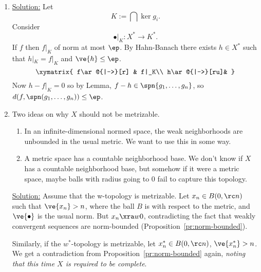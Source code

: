 \begin{enumerate}




\item
\ul{Solution:} Let
\[
K:=\bigcap \ker g_i.
\]
Consider
\[\bullet|_{K}:X^*\to K^*.\] 
If $f$ then $f|_{K}$ of norm at most $\ep$. By Hahn-Banach there exists $h\in X^*$ such that $h|_{K}=f|_K$ and $\ve{h}\le \ep$.
\[
\xymatrix{
f\ar@{|->}[r] & f|_K\\
h\ar@{|->}[ru]& 
}
\]
Now $h-f|_{K}=0$ so by Lemma, $f-h\in \spn\{g_1,\ldots ,g_n\}$, so $d(f,\spn(g_1,\ldots, g_n))\le \ep$.
\item  
Two ideas on why $X$ should not be metrizable.
\begin{enumerate}
\item
In an infinite-dimensional normed space, the weak neighborhoods are unbounded in the usual metric. We want to use this in some way.
\item
A metric space has a countable neighborhood base. We don't know if $X$ has a countable neighborhood base, but somehow if it were a metric space, maybe balls with radius going to 0 fail to capture this topology.
\end{enumerate}

\ul{Solution:} Assume that the w-topology is metrizable. Let $x_n\in B(0,\rc n)$ such that $\ve{x_n}>n$, where the ball $B$ is with respect to the metric, and $\ve{\bullet}$ is the usual norm. But $x_n\xra w 0$, contradicting the fact that weakly convergent sequences are norm-bounded (Proposition~\ref{pr:norm-bounded}).

Similarly, if the $w^*$-topology is metrizable, let $x_n^*\in B(0,\rc n)$, $\ve{x_n^*}>n$. We get a contradiction from Proposition~\ref{pr:norm-bounded} again, {\it noting that this time $X$ is required to be complete}. 


\end{enumerate}
